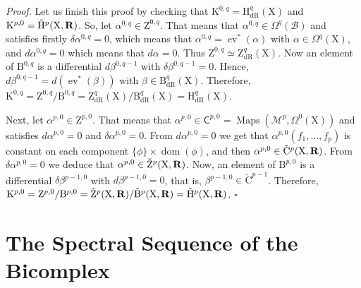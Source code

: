 \documentclass[12pt,reqno]{amsart}
\theoremstyle{article}
\renewenvironment{proof}{\noindent \textit{Proof.}} {\nolinebreak\hfill $\square$}
\def \B{\mathrm B}
\def \H{\mathrm H}
\def \K{\mathrm K}
\def \X{\mathrm X}
\def \Z{\mathrm Z}
\newcommand{\RR}{{\bf R}}
\newcommand{\cB}{{\mathcal B}}
\newcommand{\cM}{\mathcal{M}}
\newcommand{\sC}{\mathsf{C}}
\DeclareMathOperator{\dom}{dom}
\newcommand{\dR}{\mathrm{dR}}
\DeclareMathOperator{\ev}{ev}
\DeclareMathOperator{\Maps}{Maps}
\newcommand{\vB}{\check{\mathrm{B}}}
\newcommand{\vC}{\check{\mathrm{C}}}
\newcommand{\vH}{\check{\mathrm{H}}}
\newcommand{\vZ}{\check{\mathrm{Z}}}
\def \H{\mathrm H}
\begin{document}
\begin{proof}
    Let us finish this proof by checking that $\K^{0,q} = \H_\dR^q(\X)$ and $\K^{p,0} = \vH^p(\X,\RR)$.
    So,
    let $\alpha^{0,q} \in \Z^{0,q}$.
    That means that $\alpha^{0,q} \in \Omega^q(\cB)$ and satisfies firstly $\delta\alpha^{0,q} = 0$,
    which means that $\alpha^{0,q} = \ev^*(\alpha)$ with $\alpha \in \Omega^q(\X)$,
    and $d\alpha^{0,q} = 0$ which means that $d\alpha = 0$.
    Thus $\Z^{0,q} \simeq \Z_\dR^q(\X)$.
    Now an element of $\B^{0,q}$ is a differential $d\beta^{0,q-1}$ with $\delta\beta^{0,q-1}=0$.
    Hence,
    $d\beta^{0,q-1}= d(\ev^*(\beta))$ with $\beta \in \B_\dR^q(\X)$.
    Therefore,
    $\K^{0,q} = \Z^{0,q}/\B^{0,q} = \Z_\dR^q(\X)/ \B_\dR^q(\X) = \H_\dR^q(\X)$.
    
    Next,
    let $\alpha^{p,0} \in \Z^{p,0}$.
    That means that $\alpha^{p,0} \in \sC^{p,0} = \Maps(\cM^p,\Omega^0(\X))$ and satisfies $d\alpha^{p,0} = 0$ and $\delta \alpha^{p,0} = 0$.
    From $d\alpha^{p,0} = 0$ we get that $\alpha^{p,0}(f_1,\dots,f_p)$ is constant on each component $\{\phi\} \times \dom(\phi)$,
    and then $\alpha^{p,0} \in \vC^p(\X,\RR)$.
    From $\delta \alpha^{p,0} = 0$ we deduce that $\alpha^{p,0} \in \vZ^p(\X,\RR)$.
    Now,
    an element of $\B^{p,0}$ is a differential $\delta\beta^{p-1,0}$ with $d\beta^{p-1,0} = 0$,
    that is,
    $\beta^{p-1,0} \in \vC^{p-1}$.
    Therefore,
    $\K^{p,0} = \Z^{p,0}/\B^{p,0} = \vZ^p(\X,\RR)/\vB^p(\X,\RR) = \vH^p(\X,\RR)$.
  \end{proof}
  
  \section{The Spectral Sequence of the Bicomplex}
  
\end{document}

